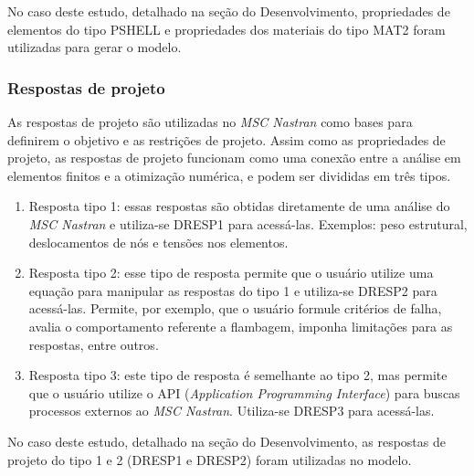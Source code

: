 No caso deste estudo, detalhado na seção do Desenvolvimento, propriedades de elementos do tipo PSHELL e propriedades dos materiais do tipo MAT2 foram utilizadas para gerar o modelo.

\subsubsection{Respostas de projeto}
As respostas de projeto são utilizadas no \emph{MSC Nastran} como bases para definirem o objetivo e as restrições de projeto. Assim como as propriedades de projeto, as respostas de projeto funcionam como uma conexão entre a análise em elementos finitos e a otimização numérica, e podem ser divididas em três tipos.

\begin{enumerate}
\item Resposta tipo 1: essas respostas são obtidas diretamente de uma análise do \emph{MSC Nastran} e utiliza-se DRESP1 para acessá-las. Exemplos: peso estrutural, deslocamentos de nós e tensões nos elementos.
\item Resposta tipo 2: esse tipo de resposta permite que o usuário utilize uma equação para manipular as respostas do tipo 1 e utiliza-se DRESP2 para acessá-las. Permite, por exemplo, que o usuário formule critérios de falha, avalia o comportamento referente a flambagem, imponha limitações para as respostas, entre outros.
\item Resposta tipo 3: este tipo de resposta é semelhante ao tipo 2, mas permite que o usuário utilize o API (\emph{Application Programming Interface}) para buscas processos externos ao \emph{MSC Nastran}. Utiliza-se DRESP3 para acessá-las.
\end{enumerate}

No caso deste estudo, detalhado na seção do Desenvolvimento, as respostas de projeto do tipo 1 e 2 (DRESP1 e DRESP2) foram utilizadas no modelo.
